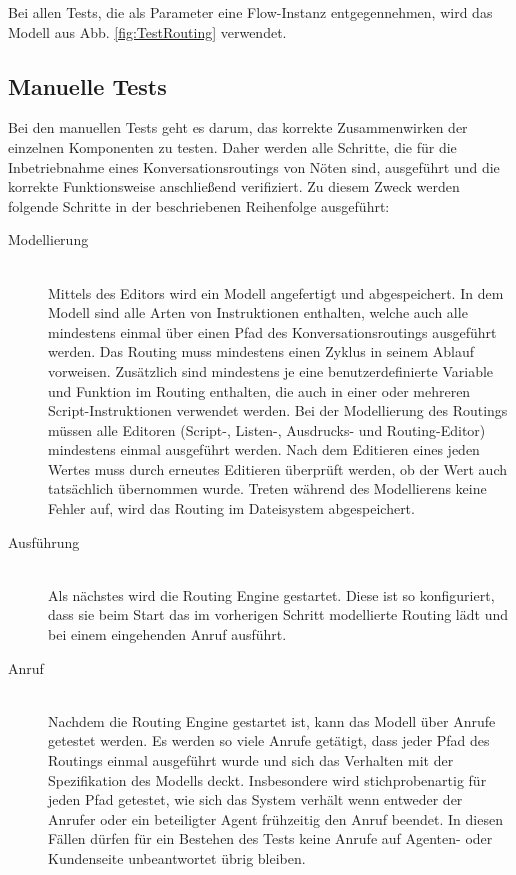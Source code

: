 Bei allen Tests, die als Parameter eine Flow-Instanz entgegennehmen, wird das Modell aus Abb. \ref{fig:TestRouting} verwendet. 

\subsection{Manuelle Tests}
Bei den manuellen Tests geht es darum, das korrekte Zusammenwirken der einzelnen Komponenten zu testen. Daher werden alle Schritte, die für die Inbetriebnahme eines Konversationsroutings von Nöten sind, ausgeführt und die korrekte Funktionsweise anschließend verifiziert. Zu diesem Zweck werden folgende Schritte in der beschriebenen Reihenfolge ausgeführt:
\begin{description}
\item[Modellierung] \hfill \\
Mittels des Editors wird ein Modell angefertigt und abgespeichert. In dem Modell sind alle Arten von Instruktionen enthalten, welche auch alle mindestens einmal über einen Pfad des Konversationsroutings ausgeführt werden. Das Routing muss mindestens einen Zyklus in seinem Ablauf vorweisen. Zusätzlich sind mindestens je eine benutzerdefinierte Variable und Funktion im Routing enthalten, die auch in einer oder mehreren Script-Instruktionen verwendet werden. Bei der Modellierung des Routings müssen alle Editoren (Script-, Listen-, Ausdrucks- und Routing-Editor) mindestens einmal ausgeführt werden. Nach dem Editieren eines jeden Wertes muss durch erneutes Editieren überprüft werden, ob der Wert auch tatsächlich übernommen wurde. Treten während des Modellierens keine Fehler auf, wird das Routing im Dateisystem abgespeichert. 
\item[Ausführung] \hfill \\
Als nächstes wird die Routing Engine gestartet. Diese ist so konfiguriert, dass sie beim Start das im vorherigen Schritt modellierte Routing lädt und bei einem eingehenden Anruf ausführt.
\item[Anruf] \hfill \\
Nachdem die Routing Engine gestartet ist, kann das Modell über Anrufe getestet werden. Es werden so viele Anrufe getätigt, dass jeder Pfad des Routings einmal ausgeführt wurde und sich das Verhalten mit der Spezifikation des Modells deckt. Insbesondere wird stichprobenartig für jeden Pfad getestet, wie sich das System verhält wenn entweder der Anrufer oder ein beteiligter Agent frühzeitig den Anruf beendet. In diesen Fällen dürfen für ein Bestehen des Tests keine Anrufe auf Agenten- oder Kundenseite unbeantwortet übrig bleiben.
\end{description}
